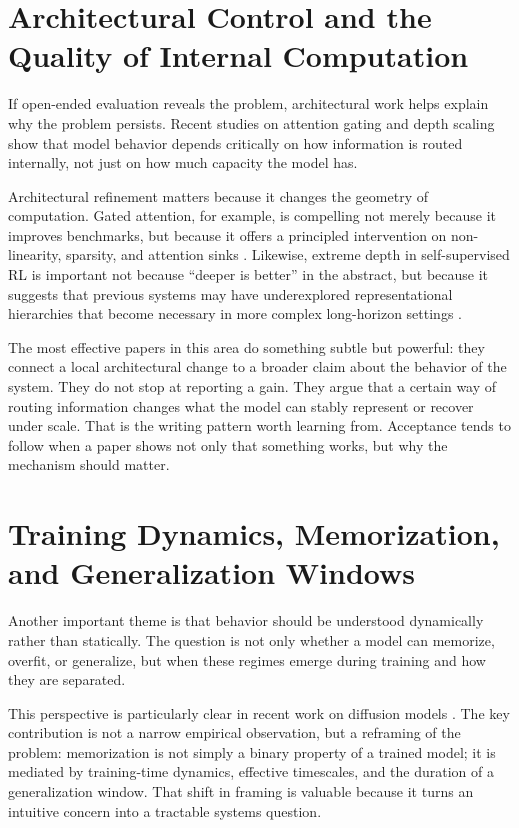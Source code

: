 \section{Architectural Control and the Quality of Internal Computation}
If open-ended evaluation reveals the problem, architectural work helps explain why the problem persists. Recent studies on attention gating and depth scaling show that model behavior depends critically on how information is routed internally, not just on how much capacity the model has.

Architectural refinement matters because it changes the geometry of computation. Gated attention, for example, is compelling not merely because it improves benchmarks, but because it offers a principled intervention on non-linearity, sparsity, and attention sinks \citep{gated2025}. Likewise, extreme depth in self-supervised RL is important not because ``deeper is better'' in the abstract, but because it suggests that previous systems may have underexplored representational hierarchies that become necessary in more complex long-horizon settings \citep{wang2025rl}.

The most effective papers in this area do something subtle but powerful: they connect a local architectural change to a broader claim about the behavior of the system. They do not stop at reporting a gain. They argue that a certain way of routing information changes what the model can stably represent or recover under scale. That is the writing pattern worth learning from. Acceptance tends to follow when a paper shows not only that something works, but why the mechanism should matter.

\section{Training Dynamics, Memorization, and Generalization Windows}
Another important theme is that behavior should be understood dynamically rather than statically. The question is not only whether a model can memorize, overfit, or generalize, but when these regimes emerge during training and how they are separated.

This perspective is particularly clear in recent work on diffusion models \citep{diffusion2025}. The key contribution is not a narrow empirical observation, but a reframing of the problem: memorization is not simply a binary property of a trained model; it is mediated by training-time dynamics, effective timescales, and the duration of a generalization window. That shift in framing is valuable because it turns an intuitive concern into a tractable systems question.


